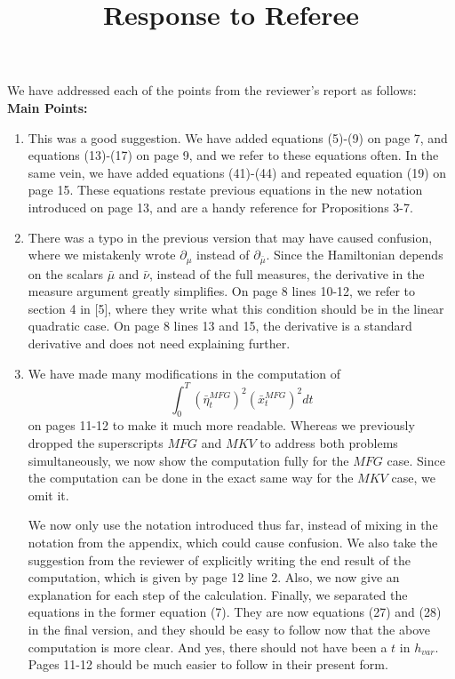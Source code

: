 \documentclass[11pt]{article}
\title{Response to Referee}
\author{}
\begin{document}
\maketitle

We have addressed each of the points from the reviewer's report as follows:\\

\hspace{-7mm} \textbf{Main Points:}
\begin{enumerate}
	\item This was a good suggestion. We have added equations (5)-(9) on page 7, and equations (13)-(17) on page 9, and we refer to these equations often. In the same vein, we have added equations (41)-(44) and repeated equation (19) on page 15. These equations restate previous equations in the new notation introduced on page 13, and are a handy reference for Propositions 3-7.
	\item There was a typo in the previous version that may have caused confusion, where we mistakenly wrote $\partial_{\mu}$ instead of $\partial_{\bar{\mu}}$. Since the Hamiltonian depends on the scalars $\bar{\mu}$ and $\bar{\nu}$, instead of the full measures, the derivative in the measure argument greatly simplifies. On page 8 lines 10-12, we refer to section 4 in [5], where they write what this condition should be in the linear quadratic case. On page 8 lines 13 and 15, the derivative is a standard derivative and does not need explaining further. 
	\item We have made many modifications in the computation of
	 $$\int_0^T (\bar{\eta}^{MFG}_t)^2 (\bar{x}^{MFG}_t)^2dt$$
	  on pages 11-12 to make it much more readable. Whereas we previously dropped the superscripts $MFG$ and $MKV$ to address both problems simultaneously, we now show the computation fully for the $MFG$ case. Since the computation can be done in the exact same way for the $MKV$ case, we omit it.
	  
	  We now only use the notation introduced thus far, instead of mixing in the notation from the appendix, which could cause confusion. We also take the suggestion from the reviewer of explicitly writing the end result of the computation, which is given by page 12 line 2. Also, we now give an explanation for each step of the calculation. Finally, we separated the equations in the former equation (7). They are now equations (27) and (28) in the final version, and they should be easy to follow now that the above computation is more clear. And yes, there should not have been a $t$ in $h_{var}$. Pages 11-12 should be much easier to follow in their present form.
	  

\end{enumerate}
\end{document}
